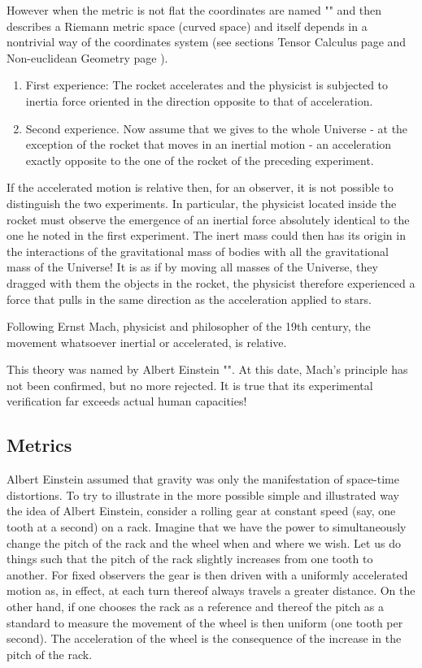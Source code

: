 	
	However when the metric is not flat the coordinates are named "" and then describes a Riemann metric space (curved space) and itself depends in a nontrivial way of the coordinates system (see sections Tensor Calculus page \pageref{curvilinear coordinates tensor calculus} and Non-euclidean Geometry page \pageref{riemann coordinates}).
	
	\begin{enumerate}
		\item First experience: The rocket accelerates and the physicist is subjected to inertia force oriented in the direction opposite to that of acceleration.
		
		\item Second experience. Now assume that we gives to the whole Universe - at the exception of the rocket that moves in an inertial motion - an acceleration exactly opposite to the one of the rocket of the preceding experiment.
	\end{enumerate}
	If the accelerated motion is relative then, for an observer, it is not possible to distinguish the two experiments. In particular, the physicist located inside the rocket must observe the emergence of an inertial force absolutely identical to the one he noted in the first experiment. The inert mass could then has its origin in the interactions of the gravitational mass of bodies with all the gravitational mass of the Universe! It is as if by moving all masses of the Universe, they dragged with them the objects in the rocket, the physicist therefore experienced a force that pulls in the same direction as the acceleration applied to stars.
	
	Following Ernst Mach, physicist and philosopher of the 19th century, the movement whatsoever inertial or accelerated, is relative.
	
	This theory was named by Albert Einstein "". At this date, Mach's principle has not been confirmed, but no more rejected. It is true that its experimental verification far exceeds actual human capacities!
	
	\subsection{Metrics}
	Albert Einstein assumed that gravity was only the manifestation of space-time distortions. To try to illustrate in the more possible simple and illustrated way the idea of Albert Einstein, consider a rolling gear at constant speed (say, one tooth at a second) on a rack. Imagine that we have the power to simultaneously change the pitch of the rack and the wheel when and where we wish. Let us do things such that the pitch of the rack slightly increases from one tooth to another. For fixed observers the gear is then driven with a uniformly accelerated motion as, in effect, at each turn thereof always travels a greater distance. On the other hand, if one chooses the rack as a reference and thereof the pitch as a standard to measure the movement of the wheel is then uniform (one tooth per second). The acceleration of the wheel is the consequence of the increase in the pitch of the rack.
	
